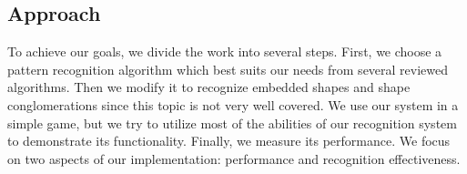 \subsection{Approach} 
To achieve our goals, we divide the work into several steps. First, we choose a pattern recognition algorithm which best suits our needs from several reviewed algorithms. Then we modify it to recognize embedded shapes and shape conglomerations since this topic is not very well covered. We use our system in a simple game, but we try to utilize most of the abilities of our recognition system to demonstrate its functionality. Finally, we measure its performance. We focus on two aspects of our implementation: performance and recognition effectiveness.
